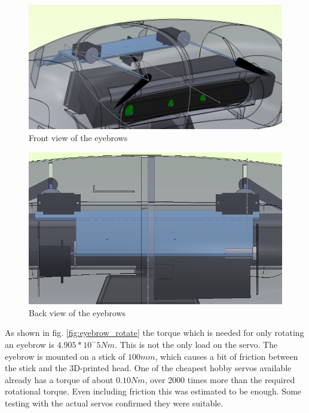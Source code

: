 \documentclass[technical_document.tex]{subfiles}
\begin{document}
\begin{figure}[ht!]
	\centering
	\mbox{\includegraphics[scale=0.4]{Images/eyebrows_front.png}}
	\caption{Front view of the eyebrows}
	\label{fig:eyebrows_front}
\end{figure}

\begin{figure}[ht!]
	\centering
	\mbox{\includegraphics[scale=0.4]{Images/eyebrows_back.png}}
	\caption{Back view of the eyebrows}
	\label{fig:eyebrows_back}
\end{figure}

As shown in fig. \ref{fig:eyebrow_rotate} the torque which is needed for only rotating an eyebrow is $4.905*10^-5Nm$. This is not the only load on the servo. The eyebrow is mounted on a stick of $100mm$, which causes a bit of friction between the stick and the 3D-printed head. One of the cheapest hobby servos available already has a torque of about $0.10Nm$, over 2000 times more than the required rotational torque. Even including friction this was estimated to be enough. Some testing with the actual servos confirmed they were suitable. 
\end{document}
